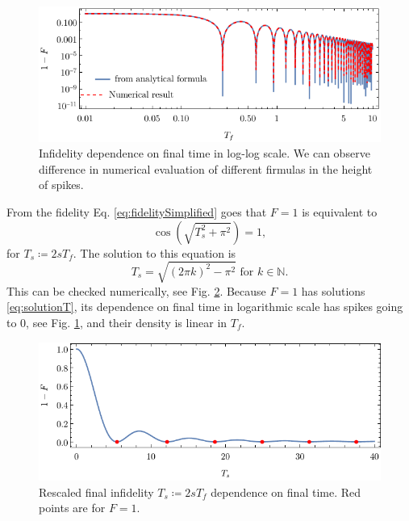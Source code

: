 \begin{figure}[H]
    \centering
    \includegraphics[scale=1.2]{../img/infidelityTfPlotLog.pdf}
    \caption{Infidelity dependence on final time in log-log scale. We can observe difference in numerical evaluation of different firmulas in the height of spikes.}
    \label{fig:infidelityTfPlotLog}
\end{figure}



From the fidelity Eq. \ref{eq:fidelitySimplified} goes that $F=1$ is equivalent to
\begin{equation}
    \cos \left(\sqrt{T_s^2+\pi ^2}\right)=1,
\end{equation}
for $T_s\coloneqq 2sT_f$. The solution to this equation is
\begin{equation}
    T_s=\sqrt{(2 \pi  k)^2-\pi ^2} \text{  for }k\in \mathbb{N}.
    \label{eq:solutionT}
\end{equation}
This can be checked numerically, see Fig. \ref{fig:fidelityZeros}. Because $F=1$ has solutions \ref{eq:solutionT}, its dependence on final time in logarithmic scale has spikes going to $0$, see Fig. \ref{fig:infidelityTfPlotLog}, and their density is linear in $T_f$.
\begin{figure}[H]
    \centering
    \includegraphics[scale=1.2]{../img/fidelityZeros.pdf}
    \caption{Rescaled final infidelity $T_s\coloneqq 2s T_f$ dependence on final time. Red points are for $F=1$.}
    \label{fig:fidelityZeros}
\end{figure}


